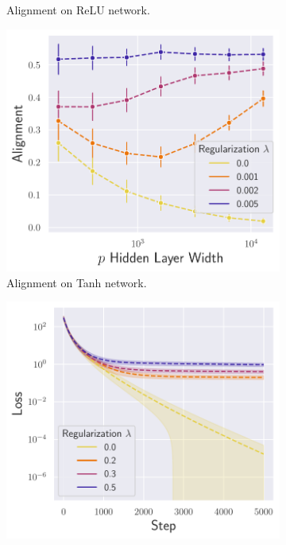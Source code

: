 \begin{figure}[ht]
\begin{subfigure}[b]{.33\textwidth}
  \caption{Alignment on ReLU network.}
  \label{fig:align_nn_relu_autograd_l2}
\end{subfigure}\hfill
\begin{subfigure}[b]{.33\textwidth}
  \centering
  \includegraphics[width=\linewidth]{figures/df_nn_tanh_autograd_l2_v6.pdf}
  \caption{Alignment on Tanh network.}
  \label{fig:align_nn_tanh_autograd_l2}
\end{subfigure}
\medskip
\begin{subfigure}[b]{.33\textwidth}
  \centering
  \includegraphics[width=\linewidth]{figures/loss_lr_non_autograd_l2_v1.pdf}

\end{subfigure}
\end{figure}
